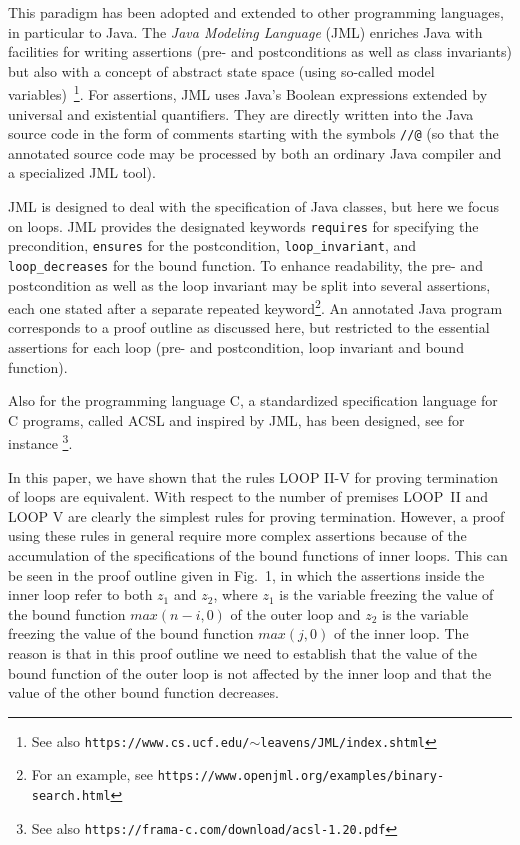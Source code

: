 \documentclass[runningheads]{llncs}       %
\begin{document}
This paradigm has been adopted and extended to other programming
languages, in particular to Java.
The \emph{Java Modeling Language} (JML) enriches Java with facilities for 
writing assertions (pre- and postconditions as well as 
class invariants) but also with a concept of abstract state space 
(using so-called model variables)~\cite{JML05}\footnote{See also
  \texttt{https://www.cs.ucf.edu/$\sim$leavens/JML/index.shtml}}.
For assertions, JML uses Java’s Boolean expressions extended by
universal and existential quantifiers. 
They are directly written into the Java source code in the form of comments 
starting with the symbols \texttt{//@}
(so that the annotated source code may be processed by both an ordinary Java compiler 
and a specialized JML tool). 

JML is designed to deal with the specification of Java classes,
but here we focus on loops.
JML provides the designated keywords 
\texttt{requires} for specifying the precondition,
\texttt{ensures} for the postcondition,
\texttt{loop\_invariant}, and 
\texttt{loop\_decreases} for the bound function.
To enhance readability, the pre- and postcondition as well as the loop invariant may be split into several
assertions, each one stated after a separate repeated keyword\footnote{For an example, see 
       \texttt{https://www.openjml.org/examples/binary-search.html}}.
An annotated Java program corresponds to a proof outline as discussed here,
but restricted to the essential assertions for each loop (pre- and postcondition,
loop invariant and bound function).

Also for the programming language C, a standardized specification language for C programs, 
called ACSL and inspired by JML, has been designed, see for instance
\cite{BBBCKKMPPS21}\footnote{See also
       \texttt{https://frama-c.com/download/acsl-1.20.pdf}}.


\medskip

In this paper, we have shown that  the rules LOOP II-V 
for proving termination of loops are equivalent.
With respect to the number of premises LOOP~II and LOOP V are clearly
the simplest rules for proving termination.
However,  a proof using these rules in general require more
complex assertions because of the accumulation of the
specifications of the bound functions of  inner loops.
This can be seen in the proof outline given in Fig.~1, 
in which the assertions inside the inner loop refer to both $z_1$ and $z_2$,
where $z_1$ is the variable freezing the value of the bound function $max(n-i,0)$ of the outer loop
and $z_2$ is the variable freezing the value of the bound function $max(j,0)$ of the inner loop.
The reason is that in this proof outline we need to establish 
that the value of the bound function of the outer loop is not affected 
by the inner loop and that the value of the other bound function decreases.
\end{document}
